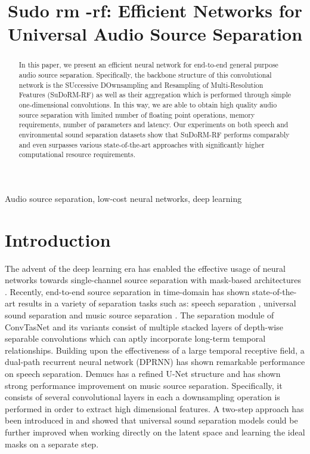 \documentclass{article}
\title{Sudo rm -rf: Efficient Networks for Universal Audio Source Separation}
\theoremstyle{definition}
\newcommand{\sudo}{SuDoRM-RF }
\newcommand{\sudodot}{SuDoRM-RF}
\begin{document}
\ninept

\maketitle

\begin{abstract}
In this paper, we present an efficient neural network for end-to-end general purpose audio source separation. Specifically, the backbone structure of this convolutional network is the SUccessive DOwnsampling and Resampling of Multi-Resolution Features (\sudodot) as well as their aggregation which is performed through simple one-dimensional convolutions. In this way, we are able to obtain high quality audio source separation with limited number of floating point operations, memory requirements, number of parameters and latency. Our experiments on both speech and environmental sound separation datasets show that \sudo performs comparably and even surpasses various state-of-the-art approaches with significantly higher computational resource requirements.  
\end{abstract}
\begin{keywords}
Audio source separation, low-cost neural networks, deep learning
\end{keywords}
\section{Introduction}
\label{sec:intro}


The advent of the deep learning era has enabled the effective usage of neural networks towards single-channel source separation with mask-based architectures \cite{huang2014deep}. Recently, end-to-end source separation in time-domain has shown state-of-the-art results in a variety of separation tasks such as: speech separation \cite{luo2019convTasNet, luo2019dual}, universal sound separation \cite{kavalerov2019universal, tzinis2019improving} and music source separation \cite{defossez2019demucs}. The separation module of ConvTasNet \cite{luo2019convTasNet} and its variants \cite{kavalerov2019universal, tzinis2019improving} consist of multiple stacked layers of depth-wise separable convolutions \cite{sifre2014depthwiseseparable} which can aptly incorporate long-term temporal relationships. Building upon the effectiveness of a large temporal receptive field, a dual-path recurrent neural network (DPRNN) \cite{luo2019dual} has shown remarkable performance on speech separation. Demucs \cite{defossez2019demucs} has a refined U-Net structure \cite{ronneberger2015original_unet} and has shown strong performance improvement on music source separation. Specifically, it consists of several convolutional layers in each a downsampling operation is performed in order to extract high dimensional features. A two-step approach has been introduced in \cite{tzinis2019two} and showed that universal sound separation models could be further improved when working directly on the latent space and learning the ideal masks on a separate step.
\end{document}
